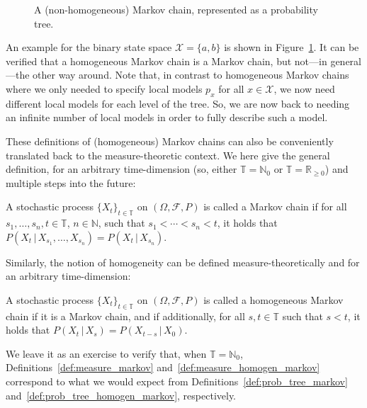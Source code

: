 \documentclass[graybox]{svmult}
\newcommand{\nats}{\mathbb{N}}
\newcommand{\natswith}{\nats_{0}}
\newcommand{\reals}{\mathbb{R}}
\newcommand{\realsnonneg}{\reals_{\geq 0}}
\newcommand{\states}{\mathcal{X}}
\newcommand{\timedim}{\mathbb{T}}
\begin{document}
\begin{figure}
\caption{A (non-homogeneous) Markov chain, represented as a probability tree.}
\label{fig:example_markov_tree}
\end{figure}
An example for the binary state space $\states=\{a,b\}$ is shown in Figure~\ref{fig:example_markov_tree}. It can be verified that a homogeneous Markov chain is a Markov chain, but not---in general---the other way around. 
Note that, in contrast to homogeneous Markov chains where we only needed to specify local models $p_x$ for all $x\in\states$, we now need different local models for each level of the tree. So, we are now back to needing an infinite number of local models in order to fully describe such a model.

These definitions of (homogeneous) Markov chains can also be conveniently translated back to the measure-theoretic context. We here give the general definition, for an arbitrary time-dimension (so, either $\timedim=\natswith$ or $\timedim=\realsnonneg$) and multiple steps into the future:
\begin{definition}\label{def:measure_markov}
A stochastic process $\{X_t\}_{t\in\timedim}$ on $(\Omega,\mathcal{F},P)$ is called a Markov chain if for all $s_1,\ldots,s_n,t\in\timedim$, $n\in\nats$, such that $s_1<\cdots<s_n<t$, it holds that $P(X_t\,\vert\,X_{s_1},\ldots,X_{s_n}) = P(X_t\,\vert\,X_{s_n})$.
\end{definition}
Similarly, the notion of homogeneity can be defined measure-theoretically and for an arbitrary time-dimension:  
\begin{definition}\label{def:measure_homogen_markov}
A stochastic process $\{X_t\}_{t\in\timedim}$ on $(\Omega,\mathcal{F},P)$ is called a homogeneous Markov chain if it is a Markov chain, and if additionally, for all $s,t\in\timedim$ such that $s<t$, it holds that $P(X_t\,\vert\,X_s)=P(X_{t-s}\,\vert\,X_0)$.
\end{definition}
We leave it as an exercise to verify that, when $\timedim=\natswith$, Definitions~\ref{def:measure_markov} and~\ref{def:measure_homogen_markov} correspond to what we would expect from Definitions~\ref{def:prob_tree_markov} and~\ref{def:prob_tree_homogen_markov}, respectively.
\end{document}
